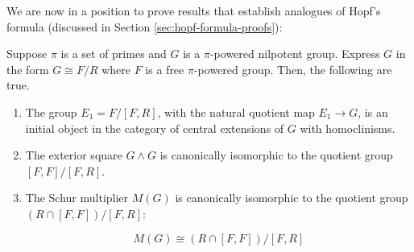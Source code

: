 \documentclass{ucetd}
\begin{document}
We are now in a position to prove results that establish analogues of
Hopf's formula (discussed in Section \ref{sec:hopf-formula-proofs}):

\begin{theorem}
  Suppose $\pi$ is a set of primes and $G$ is a $\pi$-powered
  nilpotent group. Express $G$ in the form $G \cong F/R$ where $F$ is
  a free $\pi$-powered group. Then, the following are true.

  \begin{enumerate}
  \item The group $E_1 = F/[F,R]$, with the natural quotient map $E_1
    \to G$, is an initial object in the category of central extensions
    of $G$ with homoclinisms.
  \item The exterior square $G \wedge G$ is canonically isomorphic to
    the quotient group $[F,F]/[F,R]$.
  \item The Schur multiplier $M(G)$ is canonically isomorphic to the
    quotient group $(R \cap [F,F])/[F,R]$:

    \begin{equation}\label{eq:pi-powered-hopf-formula}
      M(G) \cong (R \cap [F,F])/[F,R]
    \end{equation}
  \end{enumerate}
\end{theorem}
\end{document}
